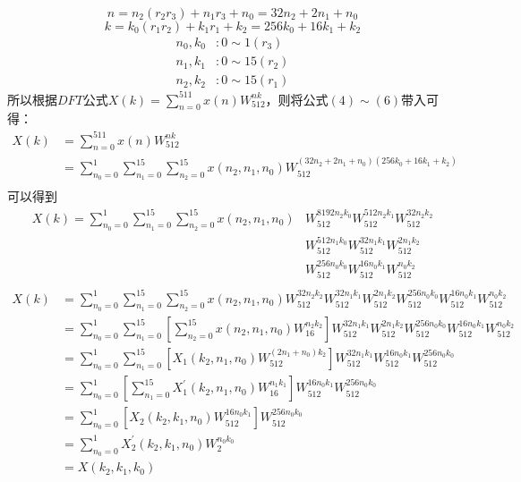 \documentclass[12pt,a4paper]{article}
\begin{document}
\begin{equation}
    n = n_2(r_2r_3) + n_1r_3 + n_0 = 32n_2 + 2n_1 + n_0
\end{equation}
\begin{equation}
    k = k_0(r_1r_2) + k_1r_1 + k_2 = 256k_0 + 16k_1 + k_2
\end{equation}
\begin{equation}
\begin{aligned}
  n_0,k_0 &: 0 \sim 1 (r_3) \\
  n_1,k_1 &: 0 \sim 15 (r_2) \\
  n_2,k_2 &: 0 \sim 15 (r_1)
\end{aligned}
\end{equation}
所以根据$DFT$公式$X(k) = \sum\limits_{n=0}^{511}x(n)W_{512}^{nk}$，则将公式$(4)\sim (6)$带入可得：
\begin{equation}
\begin{aligned}
    X(k) &= \sum_{n=0}^{511}x(n)W_{512}^{nk} \\
         &= \sum_{n_0=0}^{1} \sum_{n_1=0}^{15} \sum_{n_2=0}^{15} x(n_2,n_1,n_0)
            W_{512}^{(32n_2+2n_1+n_0)(256k_0+16k_1+k_2)} \\
\end{aligned}
\end{equation}
可以得到
\begin{equation}
\begin{aligned}
    X(k) = \sum_{n_0=0}^{1} \sum_{n_1=0}^{15} \sum_{n_2=0}^{15} x(n_2,n_1,n_0)
            &W_{512}^{8192n_2k_0} W_{512}^{512n_2k_1} W_{512}^{32n_2k_2} \\
            &W_{512}^{512n_1k_0} W_{512}^{32n_1k_1} W_{512}^{2n_1k_2}\\
            &W_{512}^{256n_0k_0} W_{512}^{16n_0k_1} W_{512}^{n_0k_2} \\
\end{aligned}
\end{equation}
\begin{equation}
\begin{aligned}
    X(k) &= \sum_{n_0=0}^{1} \sum_{n_1=0}^{15} \sum_{n_2=0}^{15} x(n_2,n_1,n_0)
            W_{512}^{32n_2k_2} W_{512}^{32n_1k_1} W_{512}^{2n_1k_2}
            W_{512}^{256n_0k_0} W_{512}^{16n_0k_1} W_{512}^{n_0k_2} \\
         &= \sum_{n_0=0}^{1} \sum_{n_1=0}^{15} [\sum_{n_2=0}^{15} x(n_2,n_1,n_0)W_{16}^{n_2k_2}]
            W_{512}^{32n_1k_1} W_{512}^{2n_1k_2} W_{512}^{256n_0k_0} W_{512}^{16n_0k_1} W_{512}^{n_0k_2} \\
         &= \sum_{n_0=0}^{1} \sum_{n_1=0}^{15} [X_1(k_2,n_1,n_0) W_{512}^{(2n_1 + n_0)k_2}]
            W_{512}^{32n_1k_1} W_{512}^{16n_0k_1} W_{512}^{256n_0k_0} \\
         &= \sum_{n_0=0}^{1} [\sum_{n_1=0}^{15} X_1^{'}(k_2,n_1,n_0) W_{16}^{n_1k_1}]
            W_{512}^{16n_0k_1} W_{512}^{256n_0k_0} \\
         &= \sum_{n_0=0}^{1} [X_2(k_2,k_1,n_0) W_{512}^{16n_0k_1}]
            W_{512}^{256n_0k_0} \\
         &= \sum_{n_0=0}^{1} X_2^{'}(k_2,k_1,n_0) W_{2}^{n_0k_0} \\
         &= X(k_2,k_1,k_0)
\end{aligned}
\end{equation}
\end{document}

